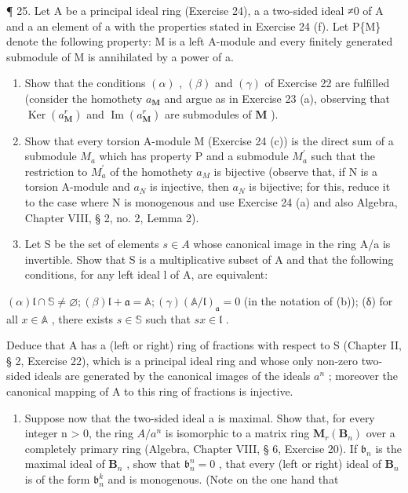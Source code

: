¶ 25. Let A be a principal ideal ring (Exercise 24), a a two-sided ideal ≠0 of A and a an element of a with the properties stated in Exercise 24 (f). Let P\{M\} denote the following property: M is a left A-module and every finitely generated submodule of M is annihilated by a power of a.

\begin{enumerate}
\def\labelenumi{(\alph{enumi})}
\item
   Show that the conditions \((\alpha)\) , \((\beta)\) and \((\gamma)\) of Exercise 22 are fulfilled (consider the homothety \(a_{\mathbf{M}}\) and argue as in Exercise 23 (a), observing that \(\operatorname{Ker}(a_{\mathbf{M}}^{r})\) and \(\operatorname{Im}(a_{\mathbf{M}}^{r})\) are submodules of \(\mathbf{M}\) ).
\item
  Show that every torsion A-module M (Exercise 24 (c)) is the direct sum of a submodule \(M_{a}\) which has property P and a submodule \(M_{a}^{\prime}\) such that the restriction to \(M_{a}^{\prime}\) of the homothety \(a_{M}\) is bijective (observe that, if N is a torsion A-module and \(a_{N}\) is injective, then \(a_{N}\) is bijective; for this, reduce it to the case where N is monogenous and use Exercise 24 (a) and also Algebra, Chapter VIII, § 2, no. 2, Lemma 2).
\item
  Let S be the set of elements \(s \in A\) whose canonical image in the ring A/a is invertible. Show that S is a multiplicative subset of A and that the following conditions, for any left ideal l of A, are equivalent:
\end{enumerate}

\((\alpha) \mathfrak{l} \cap \mathbb{S} \neq \varnothing; (\beta) \mathfrak{l} + \mathfrak{a} = \mathbb{A}; (\gamma) (\mathbb{A} / \mathfrak{l})_{\mathfrak{a}} = 0\) (in the notation of (b)); (δ) for all \(x \in \mathbb{A}\) , there exists \(s \in \mathbb{S}\) such that \(sx \in \mathfrak{l}\) .

Deduce that A has a (left or right) ring of fractions with respect to S (Chapter II, § 2, Exercise 22), which is a principal ideal ring and whose only non-zero two-sided ideals are generated by the canonical images of the ideals \(a^{n}\) ; moreover the canonical mapping of A to this ring of fractions is injective.

\begin{enumerate}
\def\labelenumi{(\alph{enumi})}
\setcounter{enumi}{3}
\tightlist
\item
  Suppose now that the two-sided ideal a is maximal. Show that, for every integer n \textgreater{} 0, the ring \(A/a^{n}\) is isomorphic to a matrix ring \(\mathbf{M}_{r}(\mathbf{B}_{n})\) over a completely primary ring (Algebra, Chapter VIII, § 6, Exercise 20). If \(\mathfrak{b}_n\) is the maximal ideal of \(\mathbf{B}_n\) , show that \(\mathfrak{b}_n^n = 0\) , that every (left or right) ideal of \(\mathbf{B}_n\) is of the form \(\mathfrak{b}_n^k\) and is monogenous. (Note on the one hand that
\end{enumerate}

